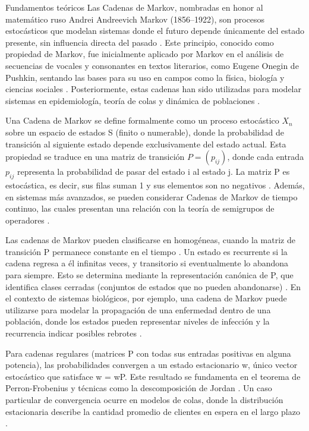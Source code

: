 
Fundamentos teóricos Las Cadenas de Markov, nombradas en honor al matemático ruso Andrei Andreevich Markov (1856–1922), son procesos estocásticos que modelan sistemas donde el futuro depende únicamente del estado presente, sin influencia directa del pasado \cite[p. 13]{matas_introduccion_2024}. Este principio, conocido como propiedad de Markov, fue inicialmente aplicado por Markov en el análisis de secuencias de vocales y consonantes en textos literarios, como Eugene Onegin de Pushkin, sentando las bases para su uso en campos como la física, biología y ciencias sociales \cite[p. 11]{matas_introduccion_2024}. Posteriormente, estas cadenas han sido utilizadas para modelar sistemas en epidemiología, teoría de colas y dinámica de poblaciones \cite[p. 5]{bobadilla_cadenas_2010}.

Una Cadena de Markov se define formalmente como un proceso estocástico ${X_n}$ sobre un espacio de estados S (finito o numerable), donde la probabilidad de transición al siguiente estado depende exclusivamente del estado actual. Esta propiedad se traduce en una matriz de transición $P = (p_{ij})$, donde cada entrada $p_{ij}$ representa la probabilidad de pasar del estado i al estado j. La matriz P es estocástica, es decir, sus filas suman 1 y sus elementos son no negativos \cite[p. 14-15]{matas_introduccion_2024}. Además, en sistemas más avanzados, se pueden considerar Cadenas de Markov de tiempo continuo, las cuales presentan una relación con la teoría de semigrupos de operadores  \cite[p. 6]{bobadilla_cadenas_2010}.

Las cadenas de Markov pueden clasificarse en homogéneas, cuando la matriz de transición P permanece constante en el tiempo \cite[p. 23]{matas_introduccion_2024}. Un estado es recurrente si la cadena regresa a él infinitas veces, y transitorio si eventualmente lo abandona para siempre. Esto se determina mediante la representación canónica de P, que identifica clases cerradas (conjuntos de estados que no pueden abandonarse) \cite[p. 24-25]{matas_introduccion_2024}. En el contexto de sistemas biológicos, por ejemplo, una cadena de Markov puede utilizarse para modelar la propagación de una enfermedad dentro de una población, donde los estados pueden representar niveles de infección y la recurrencia indicar posibles rebrotes  \cite[p. 91]{bobadilla_cadenas_2010}.

Para cadenas regulares (matrices P con todas sus entradas positivas en alguna potencia), las probabilidades convergen a un estado estacionario w, único vector estocástico que satisface w = wP. Este resultado se fundamenta en el teorema de Perron-Frobenius y técnicas como la descomposición de Jordan \cite[p. 29-30]{matas_introduccion_2024}. Un caso particular de convergencia ocurre en modelos de colas, donde la distribución estacionaria describe la cantidad promedio de clientes en espera en el largo plazo  \cite[p. 84]{bobadilla_cadenas_2010}.

